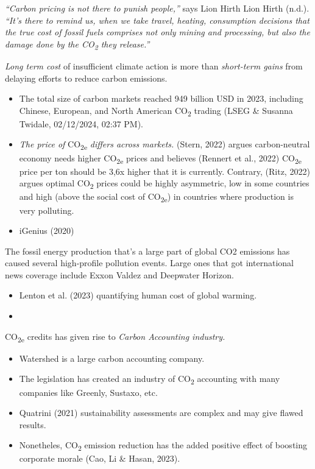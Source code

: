 \documentclass[
  letterpaper,
  DIV=11,
  numbers=noendperiod]{scrartcl}
\providecommand{\tightlist}{%
  \setlength{\itemsep}{0pt}\setlength{\parskip}{0pt}}\usepackage{longtable,booktabs,array}
\begin{document}
\emph{``Carbon pricing is not there to punish people,''} says Lion Hirth
Lion Hirth (n.d.). \emph{``It's there to remind us, when we take travel,
heating, consumption decisions that the true cost of fossil fuels
comprises not only mining and processing, but also the damage done by
the CO\textsubscript{2} they release.''}

\emph{Long term cost} of insufficient climate action is more than
\emph{short-term gains} from delaying efforts to reduce carbon
emissions.

\begin{itemize}
\item
  The total size of carbon markets reached 949 billion USD in 2023,
  including Chinese, European, and North American CO\textsubscript{2}
  trading (LSEG \& Susanna Twidale, 02/12/2024, 02:37 PM).
\item
  \emph{The price of} CO\textsubscript{2e} \emph{differs across
  markets.} (Stern, 2022) argues carbon-neutral economy needs higher
  CO\textsubscript{2e} prices and believes (Rennert et al., 2022)
  CO\textsubscript{2e} price per ton should be 3,6x higher that it is
  currently. Contrary, (Ritz, 2022) argues optimal CO\textsubscript{2}
  prices could be highly asymmetric, low in some countries and high
  (above the social cost of CO\textsubscript{2e}) in countries where
  production is very polluting.
\item
  iGenius (2020)
\end{itemize}

The fossil energy production that's a large part of global CO2 emissions
has caused several high-profile pollution events. Large ones that got
international news coverage include Exxon Valdez and Deepwater Horizon.

\begin{itemize}
\tightlist
\item
  Lenton et al. (2023) quantifying human cost of global warming.
\item
\end{itemize}

CO\textsubscript{2e} credits has given rise to \emph{Carbon Accounting
industry.}

\begin{itemize}
\item
  Watershed is a large carbon accounting company.
\item
  The legislation has created an industry of CO\textsubscript{2}
  accounting with many companies like Greenly, Sustaxo, etc.
\item
  Quatrini (2021) sustainability assessments are complex and may give
  flawed results.
\item
  Nonetheles, CO\textsubscript{2} emission reduction has the added
  positive effect of boosting corporate morale (Cao, Li \& Hasan, 2023).
\end{itemize}
\end{document}
